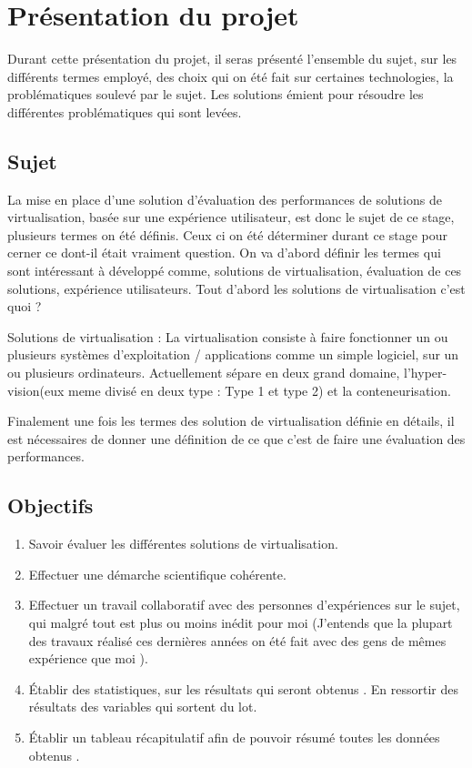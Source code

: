 \chapter{Présentation du projet}

Durant cette présentation du projet, il seras présenté l'ensemble du sujet, sur les différents termes employé, des choix qui on été fait sur certaines technologies, la problématiques soulevé par le sujet. Les solutions émient pour résoudre les différentes problématiques qui sont levées. 

\section{Sujet}

La mise en place d'une solution d’évaluation des performances de solutions de virtualisation, basée sur une expérience utilisateur, est donc le sujet de ce stage, plusieurs termes on été définis. Ceux ci on été déterminer durant ce stage pour cerner ce dont-il était vraiment question.  On va d'abord définir les termes qui sont intéressant à développé comme, solutions de virtualisation, évaluation de ces solutions, expérience utilisateurs. 
Tout d'abord les solutions de virtualisation c'est quoi ? 

\begin{mydef}
Solutions de virtualisation : La virtualisation consiste à faire fonctionner un ou plusieurs systèmes d'exploitation / applications comme un simple logiciel, sur un ou plusieurs ordinateurs. Actuellement sépare en deux grand domaine, l’hyper-vision(eux meme divisé en deux type : Type 1 et type 2) et la conteneurisation.
\end{mydef}

Finalement une fois les termes des solution de virtualisation définie en détails, il est nécessaires de donner une définition de ce que c'est de faire une évaluation des performances. 
\newpage
\section{Objectifs}
\begin{enumerate}
	\item Savoir évaluer les différentes solutions de virtualisation. 	
	\item Effectuer une démarche scientifique cohérente.
	\item Effectuer un travail collaboratif avec des personnes d’expériences sur le sujet, qui malgré tout est plus ou moins inédit pour moi (J’entends que la plupart des travaux réalisé ces dernières années on été fait avec des gens de mêmes expérience que moi ).
	\item Établir des statistiques, sur les résultats qui seront obtenus . En ressortir des résultats des variables qui sortent du lot.
	\item Établir un tableau récapitulatif afin de pouvoir résumé toutes les données obtenus .
	
\end{enumerate}
